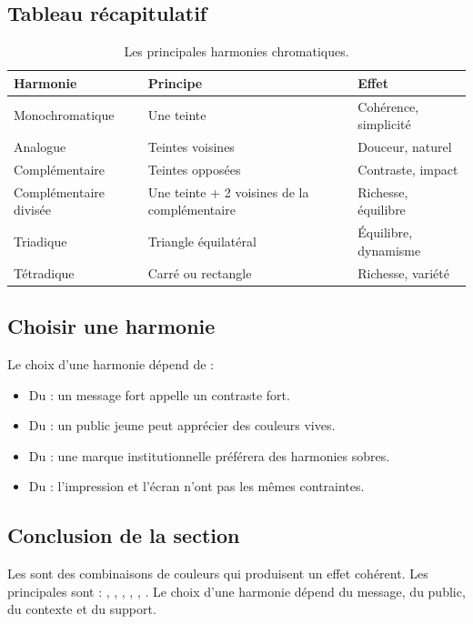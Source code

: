 \subsection{Tableau récapitulatif}

\begin{table}[h!]
\centering
\begin{tabular}{@{}lll@{}}
\toprule
\textbf{Harmonie} & \textbf{Principe} & \textbf{Effet} \\
\midrule
Monochromatique & Une teinte & Cohérence, simplicité \\
Analogue & Teintes voisines & Douceur, naturel \\
Complémentaire & Teintes opposées & Contraste, impact \\
Complémentaire divisée & Une teinte + 2 voisines de la complémentaire & Richesse, équilibre \\
Triadique & Triangle équilatéral & Équilibre, dynamisme \\
Tétradique & Carré ou rectangle & Richesse, variété \\
\bottomrule
\end{tabular}
\caption{Les principales harmonies chromatiques.}
\end{table}

\subsection{Choisir une harmonie}

Le choix d'une harmonie dépend de :

\begin{itemize}
    \item Du  : un message fort appelle un contraste fort.
    \item Du  : un public jeune peut apprécier des couleurs vives.
    \item Du  : une marque institutionnelle préférera des harmonies sobres.
    \item Du  : l'impression et l'écran n'ont pas les mêmes contraintes.
\end{itemize}

\subsection*{Conclusion de la section}

\begin{retenir}
Les  sont des combinaisons de couleurs qui produisent un effet cohérent. Les principales sont : , , , , , . Le choix d'une harmonie dépend du message, du public, du contexte et du support.
\end{retenir}

